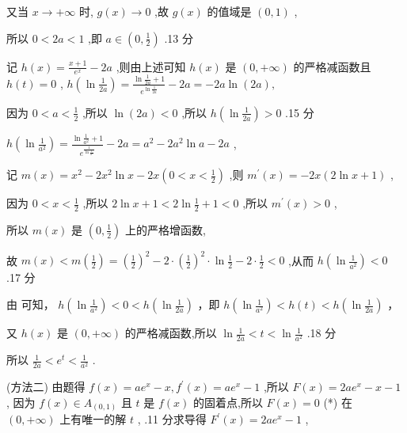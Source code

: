 \documentclass[10pt]{article}
\newcommand*\circled[1]{\tikz[baseline=(char.base)]{\node[shape=circle,draw,inner sep=1.5pt] (char) {\small #1};}}
\begin{document}
又当 \(x \rightarrow   + \infty\) 时, \(g\left( x\right)  \rightarrow  0\) ,故 \(g\left( x\right)\) 的值域是 \(\left( {0,1}\right)\) ,

所以 \(0 < {2a} < 1\) ,即 \(a \in  \left( {0,\frac{1}{2}}\right)\) .13 分

记 \(h\left( x\right)  = \frac{x + 1}{{e}^{x}} - {2a}\) ,则由上述可知 \(h\left( x\right)\) 是 \(\left( {0, + \infty }\right)\) 的严格减函数且 \(h\left( t\right)  = 0\) , \(h\left( {\ln \frac{1}{2a}}\right)  = \frac{\ln \frac{1}{2a} + 1}{{e}^{\ln \frac{1}{2a}}} - {2a} =  - {2a}\ln \left( {2a}\right) ,\)

因为 \(0 < a < \frac{1}{2}\) ,所以 \(\ln \left( {2a}\right)  < 0\) ,所以 \(h\left( {\ln \frac{1}{2a}}\right)  > 0\) .15 分

\(h\left( {\ln \frac{1}{{a}^{2}}}\right)  = \frac{\ln \frac{1}{{a}^{2}} + 1}{{e}^{\frac{1}{\ln \frac{1}{{a}^{2}}}}} - {2a} = {a}^{2} - 2{a}^{2}\ln a - {2a}\) ,

记 \(m\left( x\right)  = {x}^{2} - 2{x}^{2}\ln x - {2x}\left( {0 < x < \frac{1}{2}}\right)\) ,则 \({m}^{\prime }\left( x\right)  =  - {2x}\left( {2\ln x + 1}\right)\) ,

因为 \(0 < x < \frac{1}{2}\) ,所以 \(2\ln x + 1 < 2\ln \frac{1}{2} + 1 < 0\) ,所以 \({m}^{\prime }\left( x\right)  > 0\) ,

所以 \(m\left( x\right)\) 是 \(\left( {0,\frac{1}{2}}\right)\) 上的严格增函数,

故 \(m\left( x\right)  < m\left( \frac{1}{2}\right)  = {\left( \frac{1}{2}\right) }^{2} - 2 \cdot  {\left( \frac{1}{2}\right) }^{2} \cdot  \ln \frac{1}{2} - 2 \cdot  \frac{1}{2} < 0\) ,从而 \(h\left( {\ln \frac{1}{{a}^{2}}}\right)  < 0\) .17 分

由 \circled{1}  \circled{2} 可知， \(h\left( {\ln \frac{1}{{a}^{2}}}\right)  < 0 < h\left( {\ln \frac{1}{2a}}\right)\) ，即 \(h\left( {\ln \frac{1}{{a}^{2}}}\right)  < h\left( t\right)  < h\left( {\ln \frac{1}{2a}}\right)\) ，

又 \(h\left( x\right)\) 是 \(\left( {0, + \infty }\right)\) 的严格减函数,所以 \(\ln \frac{1}{2a} < t < \ln \frac{1}{{a}^{2}}\) .18 分

所以 \(\frac{1}{2a} < {e}^{t} < \frac{1}{{a}^{2}}\) .

(方法二) 由题得 \(f\left( x\right)  = a{e}^{x} - x,{f}^{\prime }\left( x\right)  = a{e}^{x} - 1\) ,所以 \(F\left( x\right)  = {2a}{e}^{x} - x - 1\) , 因为 \(f\left( x\right)  \in  {A}_{\left( 0,1\right) }\) 且 \(t\) 是 \(f\left( x\right)\) 的固着点,所以 \(F\left( x\right)  = 0\) (*) 在 \(\left( {0, + \infty }\right)\) 上有唯一的解 \(t\) , .11 分求导得 \({F}^{\prime }\left( x\right)  = {2a}{e}^{x} - 1\) ,
\end{document}
